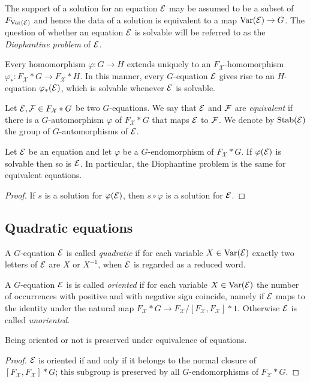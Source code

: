 \documentclass[a4paper,11pt]{amsart}
\begin{document}
The support of a solution for an equation $\mathcal{E}$ may be assumed to be
a subset of $F_{\textup{Var}(\mathcal{E})}$ and hence the data of a solution
is equivalent to a map $\textup{Var}(\mathcal{E}) \to G$.  The question of whether an
equation $\mathcal{E}$ is solvable will be referred to as the \emph{Diophantine
problem} of $\mathcal{E}$.

Every homomorphism $\varphi \colon G \to H$ extends uniquely to an
$F_{\mathcal{X}}$-ho\-mo\-morphism $\varphi_* \colon F_{\mathcal{X}}*G \to F_{\mathcal{X}}*H$.
In this manner, every $G$-equation $\mathcal{E}$ gives rise to an $H$-equation $\varphi_*(\mathcal{E})$,
which is solvable whenever $\mathcal{E}$ is solvable.

\begin{defi}
  Let $\mathcal{E},\mathcal{F}\in F_{\mathcal{X}}* G$ be two $G$-equations. We
  say that $\mathcal{E}$ and $\mathcal{F}$ are \emph{equivalent} if there is a
  $G$-automorphism $\varphi$ of $F_{\mathcal{X}}*G$ that maps $\mathcal{E}$
  to $\mathcal{F}$. We denote by $\operatorname{Stab}(\mathcal{E})$ the group of
  $G$-automorphisms of $\mathcal{E}$.
\end{defi}
\begin{lem}
  Let $\mathcal{E}$ be an equation and let $\varphi$ be a $G$-endomorphism of
  $F_{\mathcal{X}}*G$. If $\varphi(\mathcal{E})$ is solvable then so is $\mathcal{E}$. In particular,
  the Diophantine problem is the same for equivalent equations.
\end{lem}
\begin{proof}
  If $s$ is a solution for $\varphi(\mathcal{E})$, then $s\circ\varphi$ is a
  solution for $\mathcal{E}$.
\end{proof}

\subsection{Quadratic equations}
A $G$-equation $\mathcal{E}$ is called \emph{quadratic} if for each variable
$X\in \textup{Var}(\mathcal{E})$ exactly two letters of $\mathcal{E}$ are $X$ or $X^{-1}$, when
$\mathcal{E}$ is regarded as a reduced word.

A $G$-equation $\mathcal{E}$ is is called \emph{oriented} if for each variable
$X\in \textup{Var}(\mathcal{E})$ the number of occurrences with positive and with
negative sign coincide, namely if $\mathcal{E}$ maps to the identity under the
natural map $F_{\mathcal{X}}*G\to F_{\mathcal{X}}/[F_{\mathcal{X}},F_{\mathcal{X}}]*1$. 
Otherwise $\mathcal{E}$ is called \emph{unoriented}.
\begin{lem}
 Being oriented or not is preserved under equivalence of equations.
\end{lem}
\begin{proof}
  $\mathcal{E}$ is oriented if and only if it belongs to the normal closure of
  $[F_{\mathcal{X}},F_{\mathcal{X}}]*G$; this subgroup is preserved by all $G$-endomorphisms
  of $F_{\mathcal{X}}*G$.
\end{proof}
\end{document}
